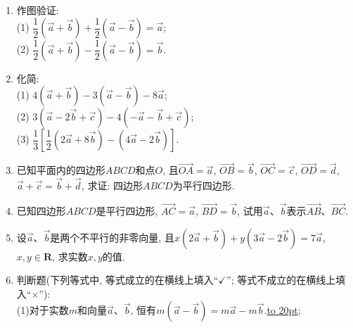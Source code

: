 \documentclass[10pt,a4paper]{article}
\newcommand{\blank}[1]{\underline{\hbox to #1pt{}}}
\begin{document}
\begin{enumerate}[1.]
\begin{center}
\end{center}
\item 作图验证:\\
(1) $\dfrac 12(\overrightarrow a+\overrightarrow b)+\dfrac 12(\overrightarrow a-\overrightarrow b)=\overrightarrow a$;\\
(2) $\dfrac 12(\overrightarrow a+\overrightarrow b)-\dfrac 12(\overrightarrow a-\overrightarrow b)=\overrightarrow b$.
\item 化简:\\
(1) $4(\overrightarrow a+\overrightarrow b)-3(\overrightarrow a-\overrightarrow b)-8\overrightarrow a$;\\
(2) $3(\overrightarrow a-2\overrightarrow b+\overrightarrow c)-4(-\overrightarrow a-\overrightarrow b+\overrightarrow c)$;\\
(3) $\dfrac 13[\dfrac 12(2\overrightarrow a+8\overrightarrow b)-(4\overrightarrow a-2\overrightarrow b)]$.
\item 已知平面内的四边形$ABCD$和点$O$, 且$\overrightarrow{OA}=\overrightarrow a$, $\overrightarrow{OB}=\overrightarrow b$, $\overrightarrow{OC}=\overrightarrow c$, $\overrightarrow{OD}=\overrightarrow d$, $\overrightarrow a+\overrightarrow c=\overrightarrow b+\overrightarrow d$, 求证: 四边形$ABCD$为平行四边形.
\item 已知四边形$ABCD$是平行四边形, $\overrightarrow{AC}=\overrightarrow a$, $\overrightarrow{BD}=\overrightarrow b$, 试用$\overrightarrow a$、$\overrightarrow b$表示$\overrightarrow{AB}$、$\overrightarrow{BC}$.
\item 设$\overrightarrow a$、$\overrightarrow b$是两个不平行的非零向量, 且$x(2\overrightarrow a+\overrightarrow b)+y(3\overrightarrow a-2\overrightarrow b)=7\overrightarrow a$, $x,y\in \mathbf{R}$, 求实数$x,y$的值.
\item 判断题(下列等式中, 等式成立的在横线上填入``$\checkmark$''; 等式不成立的在横线上填入``$\times$''):\\
(1)对于实数$m$和向量$\overrightarrow a$、$\overrightarrow b$, 恒有$m(\overrightarrow a-\overrightarrow b)=m\overrightarrow a-m\overrightarrow b$.\blank{20}; \\

\end{enumerate}
\end{document}
